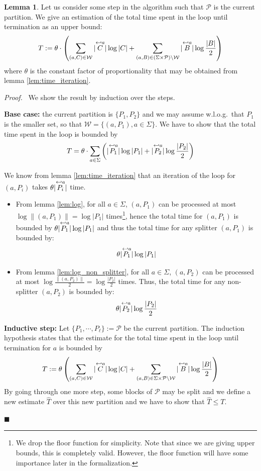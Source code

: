 \documentclass[12pt, a4 paper]{article}
\renewenvironment{proof}[1][Proof]{\begin{mdframed}[backgroundcolor=black!5, topline=false, rightline=false, bottomline=false, linecolor=black!15, linewidth=3pt]{\noindent\textit{#1.}\ }}{\noindent\par\hfill$\blacksquare$\end{mdframed}}
\theoremstyle{definition}
\newtheorem{lemma}{Lemma}
\begin{document}
\begin{lemma}\label{lem:bound}
    Let us consider some step in the algorithm such that $\mathcal{P}$ is the current partition. We give an estimation of the total time spent in the loop until termination as an upper bound:
    $$ T := \theta \cdot \left(\sum_{(a, C) \in \mathcal{W}} | \overset{\hookleftarrow {a}}{C} | \log | C | + \sum_{(a, B) \in (\Sigma\times \mathcal{P})\setminus \mathcal{W}} | \overset{\hookleftarrow {a}}{B} | \log \frac{| B |}{2} \right)$$
    where $\theta$ is the constant factor of proportionality that may be obtained from lemma \ref{lem:time_iteration}.
\end{lemma}
\begin{proof}
    We show the result by induction over the steps.

    \bigskip
    \textbf{Base case:} the current partition is $\{P_1, P_2\}$ and we may assume w.l.o.g.\ that $P_1$ is the smaller set, so that $\mathcal{W} = \{(a, P_1), a \in \Sigma\}$.
    We have to show that the total time spent in the loop is bounded by
    $$T = \theta \cdot \sum_{a \in \Sigma} \left(| \overset{\hookleftarrow {a}}{P_1} | \log | P_1 | + | \overset{\hookleftarrow {a}}{P_2} | \log \frac{| P_2 |}{2}\right)$$
    
    We know from lemma \ref{lem:time_iteration} that an iteration of the loop for $(a, P_i)$ takes $\theta | \overset{\hookleftarrow {a}}{P_i} | $ time.
    \begin{itemize}
        \item From lemma \ref{lem:log}, for all $a\in\Sigma$, $(a, P_1)$ can be processed at most $\log \| (a, P_1) \| = \log |P_1|$ times\footnote{We drop the floor function for simplicity.
        Note that since we are giving upper bounds, this is completely valid. However, the floor function will have some importance later in the formalization.}, hence the total time for $(a, P_1)$ is bounded by $\theta | \overset{\hookleftarrow {a}}{P_1} | \log | P_1 |$ and thus the total time for any splitter $(a, P_1)$ is bounded by:
        $$\theta | \overset{\hookleftarrow {a}}{P_1} | \log | P_1 |$$

        \item From lemma \ref{lem:log_non_splitter}, for all $a\in\Sigma$, $(a, P_2)$ can be processed at most $\log \frac{\| (a, P_2) \|}{2} = \log \frac{| P_2 |}{2}$ times. Thus, the total time for any non-splitter $(a, P_2)$ is bounded by:
        $$ \theta | \overset{\hookleftarrow {a}}{P_2} | \log \frac{| P_2 |}{2}$$
    \end{itemize}
    
    \textbf{Inductive step:} Let $\{P_1, \cdots, P_\ell\} := \mathcal{P}$ be the current partition.
    The induction hypothesis states that the estimate for the total time spent in the loop until termination for $a$ is bounded by
    $$ T := \theta \left(\sum_{(a, C) \in \mathcal{W}} | \overset{\hookleftarrow {a}}{C} | \log | C | + \sum_{(a, B) \in \Sigma\times \mathcal{P}\setminus \mathcal{W}} | \overset{\hookleftarrow {a}}{B} | \log \frac{| B |}{2} \right)$$
    By going through one more step, some blocks of $\mathcal{P}$ may be split and we define a new estimate $\hat{T}$ over this new partition and we have to show that $\hat{T} \leq T$.


\end{proof}
\end{document}
